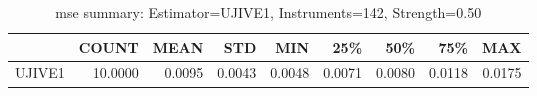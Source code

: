 \begin{table}[ht]
\centering
\caption{mse summary: Estimator=UJIVE1, Instruments=142, Strength=0.50}
\begin{tabular}{lrrrrrrrr}
\toprule
 & COUNT & MEAN & STD & MIN & 25\% & 50\% & 75\% & MAX \\
\midrule
UJIVE1 & 10.0000 & 0.0095 & 0.0043 & 0.0048 & 0.0071 & 0.0080 & 0.0118 & 0.0175 \\
\bottomrule
\end{tabular}
\end{table}
